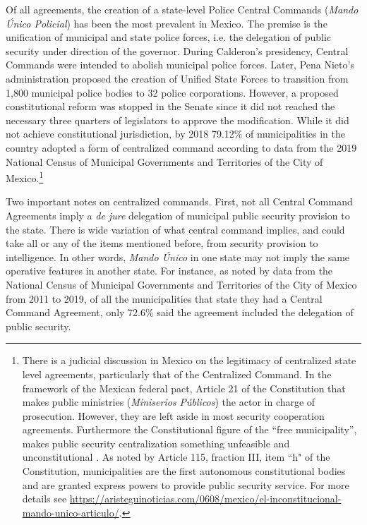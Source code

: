 \documentclass[12pt]{amsart}
\numberwithin{equation}{section}
\theoremstyle{definition}
\theoremstyle{definition}
\theoremstyle{definition}
\begin{document}
Of all agreements, the creation of a state-level Police Central Commands (\emph{Mando \'Unico Policial}) has been the most prevalent in Mexico. The premise is the unification of municipal and state police forces, i.e. the delegation of public security under direction of the governor. During Calderon's presidency, Central Commands were intended to abolish municipal police forces. Later, Pena Nieto's administration proposed the creation of Unified State Forces to transition from 1,800 municipal police bodies to 32 police corporations. However, a proposed constitutional reform was stopped in the Senate since it did not reached the necessary three quarters of legislators to approve the  modification. While it did not achieve constitutional jurisdiction, by 2018 79.12\% of municipalities in the country adopted a form of centralized command according to data from the 2019 National Census of Municipal Governments and Territories of the City of Mexico.\footnote{There is a judicial discussion in Mexico on the legitimacy of centralized state level agreements, particularly that of the Centralized Command. In the framework of the Mexican federal pact, Article 21 of the Constitution that makes public ministries (\emph{Miniserios P\'ublicos}) the actor in charge of prosecution. However, they are  left aside in most security cooperation agreements. Furthermore the Constitutional figure of the ``free municipality'', makes public security centralization something unfeasible and unconstitutional \citep{moloeznik_2016}. As noted by Article 115, fraction III, item ``h" of the Constitution, municipalities are the first autonomous constitutional bodies and are granted express powers to provide public security service. For more details see \url{https://aristeguinoticias.com/0608/mexico/el-inconstitucional-mando-unico-articulo/}.}  

Two important notes on centralized commands. First, not all Central Command Agreements imply a \emph{de jure} delegation of municipal public security provision to the state. There is wide variation of what central command implies, and could take all or any of the items mentioned before, from security provision to intelligence. In other words, \emph{Mando \'Unico} in one state may not imply the same operative features in another state.  %
For instance, as noted by data from the National Census of Municipal Governments and Territories of the City of Mexico from 2011 to 2019, of all the municipalities that state they had a Central Command Agreement, only 72.6\% said the agreement included the delegation of public security.
\end{document}
